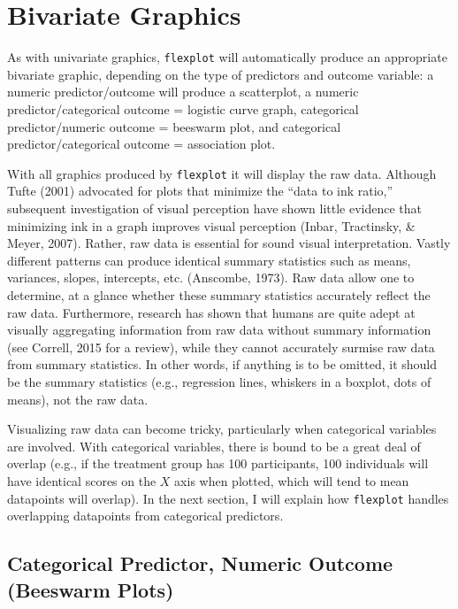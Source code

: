 \documentclass[
  english,
  man]{apa6}
\begin{document}
\hypertarget{bivariate-graphics}{%
\section{Bivariate Graphics}\label{bivariate-graphics}}

As with univariate graphics, \texttt{flexplot} will automatically produce an appropriate bivariate graphic, depending on the type of predictors and outcome variable: a numeric predictor/outcome will produce a scatterplot, a numeric predictor/categorical outcome = logistic curve graph, categorical predictor/numeric outcome = beeswarm plot, and categorical predictor/categorical outcome = association plot.

With all graphics produced by \texttt{flexplot} it will display the raw data. Although Tufte (2001) advocated for plots that minimize the ``data to ink ratio,'' subsequent investigation of visual perception have shown little evidence that minimizing ink in a graph improves visual perception (Inbar, Tractinsky, \& Meyer, 2007). Rather, raw data is essential for sound visual interpretation. Vastly different patterns can produce identical summary statistics such as means, variances, slopes, intercepts, etc. (Anscombe, 1973). Raw data allow one to determine, at a glance whether these summary statistics accurately reflect the raw data. Furthermore, research has shown that humans are quite adept at visually aggregating information from raw data without summary information (see Correll, 2015 for a review), while they cannot accurately surmise raw data from summary statistics. In other words, if anything is to be omitted, it should be the summary statistics (e.g., regression lines, whiskers in a boxplot, dots of means), not the raw data.

Visualizing raw data can become tricky, particularly when categorical variables are involved. With categorical variables, there is bound to be a great deal of overlap (e.g., if the treatment group has 100 participants, 100 individuals will have identical scores on the \(X\) axis when plotted, which will tend to mean datapoints will overlap). In the next section, I will explain how \texttt{flexplot} handles overlapping datapoints from categorical predictors.

\hypertarget{categorical-predictor-numeric-outcome-beeswarm-plots}{%
\subsection{Categorical Predictor, Numeric Outcome (Beeswarm Plots)}\label{categorical-predictor-numeric-outcome-beeswarm-plots}}
\end{document}
